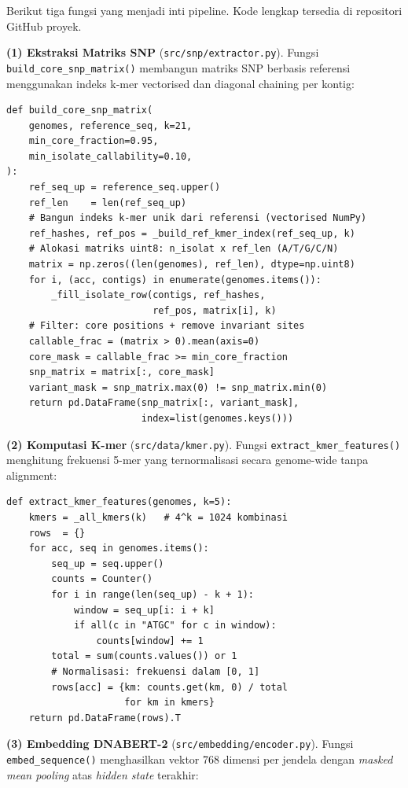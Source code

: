 \documentclass{article}
\begin{document}
Berikut tiga fungsi yang menjadi inti pipeline. Kode lengkap tersedia di
repositori GitHub proyek.

\textbf{(1) Ekstraksi Matriks SNP} (\texttt{src/snp/extractor.py}).
Fungsi \texttt{build\_core\_snp\_matrix()} membangun matriks SNP berbasis
referensi menggunakan indeks k-mer vectorised dan diagonal chaining per kontig:

\begin{lstlisting}[caption={Ekstraksi matriks core-SNP berbasis referensi.}]
def build_core_snp_matrix(
    genomes, reference_seq, k=21,
    min_core_fraction=0.95,
    min_isolate_callability=0.10,
):
    ref_seq_up = reference_seq.upper()
    ref_len    = len(ref_seq_up)
    # Bangun indeks k-mer unik dari referensi (vectorised NumPy)
    ref_hashes, ref_pos = _build_ref_kmer_index(ref_seq_up, k)
    # Alokasi matriks uint8: n_isolat x ref_len (A/T/G/C/N)
    matrix = np.zeros((len(genomes), ref_len), dtype=np.uint8)
    for i, (acc, contigs) in enumerate(genomes.items()):
        _fill_isolate_row(contigs, ref_hashes,
                          ref_pos, matrix[i], k)
    # Filter: core positions + remove invariant sites
    callable_frac = (matrix > 0).mean(axis=0)
    core_mask = callable_frac >= min_core_fraction
    snp_matrix = matrix[:, core_mask]
    variant_mask = snp_matrix.max(0) != snp_matrix.min(0)
    return pd.DataFrame(snp_matrix[:, variant_mask],
                        index=list(genomes.keys()))
\end{lstlisting}

\textbf{(2) Komputasi K-mer} (\texttt{src/data/kmer.py}).
Fungsi \texttt{extract\_kmer\_features()} menghitung frekuensi 5-mer yang
ternormalisasi secara genome-wide tanpa alignment:

\begin{lstlisting}[caption={Komputasi frekuensi pentanukleotida (5-mer).}]
def extract_kmer_features(genomes, k=5):
    kmers = _all_kmers(k)   # 4^k = 1024 kombinasi
    rows  = {}
    for acc, seq in genomes.items():
        seq_up = seq.upper()
        counts = Counter()
        for i in range(len(seq_up) - k + 1):
            window = seq_up[i: i + k]
            if all(c in "ATGC" for c in window):
                counts[window] += 1
        total = sum(counts.values()) or 1
        # Normalisasi: frekuensi dalam [0, 1]
        rows[acc] = {km: counts.get(km, 0) / total
                     for km in kmers}
    return pd.DataFrame(rows).T
\end{lstlisting}

\textbf{(3) Embedding DNABERT-2} (\texttt{src/embedding/encoder.py}).
Fungsi \texttt{embed\_sequence()} menghasilkan vektor 768 dimensi per jendela
dengan \textit{masked mean pooling} atas \textit{hidden state} terakhir:
\end{document}
